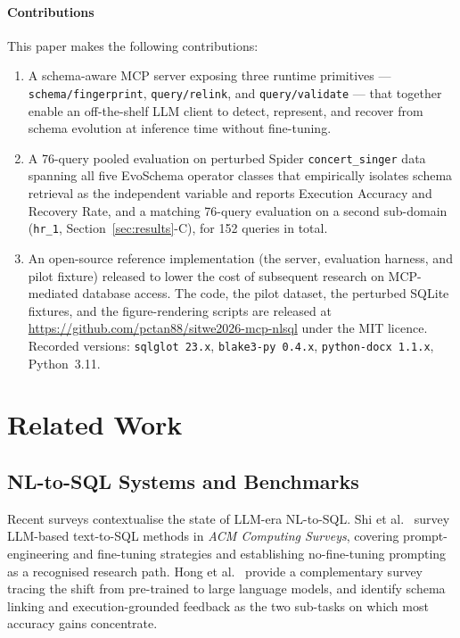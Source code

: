 \documentclass[conference,10pt,a4paper]{IEEEtran}
\begin{document}
\paragraph*{Contributions}
This paper makes the following contributions:
\begin{enumerate}
  \item A schema-aware MCP server exposing three runtime primitives ---
    \texttt{schema/fingerprint}, \texttt{query/relink}, and
    \texttt{query/validate} --- that together enable an off-the-shelf LLM
    client to detect, represent, and recover from schema evolution at
    inference time without fine-tuning.
  \item A 76-query pooled evaluation on perturbed Spider
    \texttt{concert\_singer} data spanning all five EvoSchema operator
    classes that empirically isolates schema retrieval as the
    independent variable and reports Execution Accuracy and Recovery
    Rate, and a matching 76-query evaluation on a second sub-domain
    (\texttt{hr\_1}, Section~\ref{sec:results}-C), for 152 queries in
    total.
  \item An open-source reference implementation (the server, evaluation
    harness, and pilot fixture) released to lower the cost of subsequent
    research on MCP-mediated database access. The code, the pilot
    dataset, the perturbed SQLite fixtures, and the figure-rendering
    scripts are released at \url{https://github.com/pctan88/sitwe2026-mcp-nlsql}
    under the MIT
    licence. Recorded versions: \texttt{sqlglot 23.x}, \texttt{blake3-py
    0.4.x}, \texttt{python-docx 1.1.x}, Python~3.11.
\end{enumerate}

\section{Related Work}

\subsection{NL-to-SQL Systems and Benchmarks}
Recent surveys contextualise the state of LLM-era NL-to-SQL.
Shi et al.~\cite{shi2025survey} survey LLM-based text-to-SQL methods
in \emph{ACM Computing Surveys}, covering prompt-engineering and
fine-tuning strategies and establishing no-fine-tuning prompting as a
recognised research path. Hong et al.~\cite{hong2025tkde}
provide a complementary survey tracing the shift from pre-trained to
large language models, and identify schema linking and
execution-grounded feedback as the two sub-tasks on which most
accuracy gains concentrate.
\end{document}
